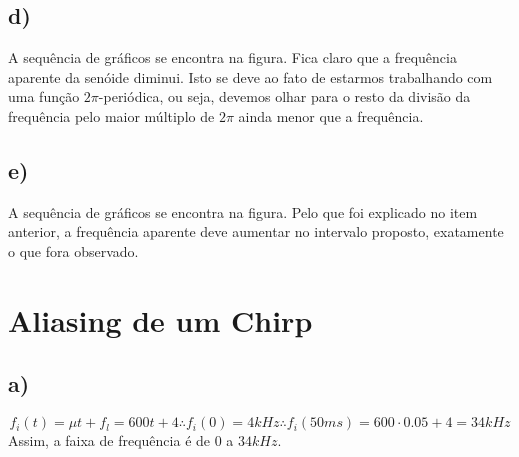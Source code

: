 \documentclass[a4paper, 12pt]{article}
\begin{document}
\subsection{d)}

A sequência de gráficos se encontra na figura. Fica claro que a frequência aparente da senóide diminui. Isto se deve ao fato de estarmos trabalhando com uma função $2\pi$-periódica, ou seja, devemos olhar para o resto da divisão da frequência pelo maior múltiplo de $2\pi$ ainda menor que a frequência.

%


\subsection{e)}

A sequência de gráficos se encontra na figura. Pelo que foi explicado no item anterior, a frequência aparente deve aumentar no intervalo proposto, exatamente o que fora observado. 

%



\section{Aliasing de um Chirp}

\subsection{a)}

$$f_i(t)=\mu t+f_l=600t+4 \therefore f_i(0)=4kHz \therefore f_i(50ms)=600\cdot 0.05+4=34kHz$$
Assim, a faixa de frequência é de $0$ a $34kHz$.
\end{document}
